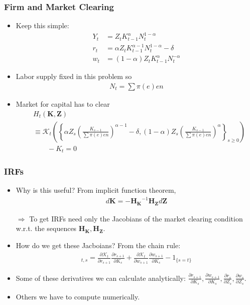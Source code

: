 \documentclass[english,xcolor=svgnames]{beamer}
\begin{document}
\begin{frame}
    \frametitle{Firm and Market Clearing}
    \begin{itemize}
        \item Keep this simple:
        \begin{align*}
        	Y_t &= Z_t K_{t-1}^{\alpha} N_t^{1-\alpha} \\
        	 r_t &= \alpha  Z_t K_{t-1}^{\alpha-1} N_t^{1-\alpha} - \delta \\
        	 w_t &= (1-\alpha) Z_t K_{t-1}^{\alpha} N_t^{-\alpha}
        \end{align*}
        \item Labor supply fixed in this problem so
        \begin{align*}
        	N_t = \sum \pi(e) en
        \end{align*}
        \item Market for capital has to clear
        \begin{align*}
        	&H_t(\bm{K},\bm{Z})  \\
        	&\equiv \mathcal{K}_t\left(\left\{\alpha  Z_s \left(\frac{K_{s-1}}{\sum \pi(e) en}\right)^{\alpha-1} - \delta,(1-\alpha) Z_s \left(\frac{K_{s-1}}{\sum \pi(e) en}\right)^{\alpha}\right\}_{s\ge 0 } \right)\\
        	&\qquad  - K_t = 0
        \end{align*}
	\end{itemize}
\end{frame}

\begin{frame}
    \frametitle{IRFs}
    \begin{itemize}
        \item Why is this useful? From implicit function theorem,
        \begin{align*}
        	d\bm{K} = - \bm{H_{K}}^{-1}\bm{H_Z} d\bm{Z}
        \end{align*}
        \item[$\Rightarrow$] To get IRFs need only the Jacobians of the market clearing condition w.r.t. the sequences $\bm{H_{K}},\bm{H_Z}$.
        \item How do we get these Jacboians? From the chain rule:
        \begin{align*}
        	[\bm{H_{K}}]_{t,s} = \frac{\partial \mathcal{K}_t}{\partial r_{s+1}}\frac{\partial r_{s+1}}{\partial K_s} + \frac{\partial \mathcal{K}_t}{\partial w_{s+1}}\frac{\partial w_{s+1}}{\partial K_s} - 1_{\{s=t\}}
        \end{align*}
        \item Some of these derivatives we can calculate analytically: $\frac{\partial r_{s+1}}{\partial K_s}, \frac{\partial w_{s+1}}{\partial K_s}, \frac{\partial r_{s}}{\partial Z_s}, \frac{\partial w_{s}}{\partial Z_s}$. 
        \item Others we have to compute numerically.
	\end{itemize}
\end{frame}
\end{document}
